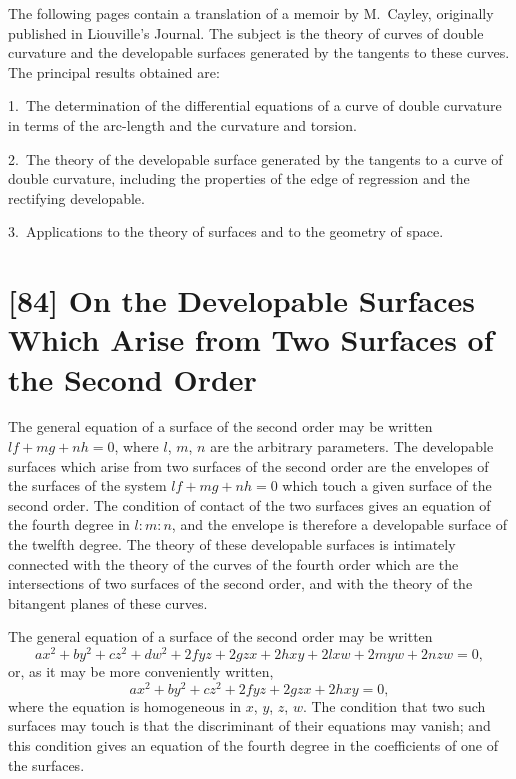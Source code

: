 \documentclass[11pt,a4paper]{book}
\begin{document}
\medskip

The following pages contain a translation of a memoir by M.~Cayley, originally published in Liouville's Journal. The subject is the theory of curves of double curvature and the developable surfaces generated by the tangents to these curves. The principal results obtained are:

1.~The determination of the differential equations of a curve of double curvature in terms of the arc-length and the curvature and torsion.

2.~The theory of the developable surface generated by the tangents to a curve of double curvature, including the properties of the edge of regression and the rectifying developable.

3.~Applications to the theory of surfaces and to the geometry of space.

\newpage
\section*{[84] On the Developable Surfaces Which Arise from Two Surfaces of the Second Order}

\bigskip

The general equation of a surface of the second order may be written $lf + mg + nh = 0$, where $l$, $m$, $n$ are the arbitrary parameters. The developable surfaces which arise from two surfaces of the second order are the envelopes of the surfaces of the system $lf + mg + nh = 0$ which touch a given surface of the second order. The condition of contact of the two surfaces gives an equation of the fourth degree in $l : m : n$, and the envelope is therefore a developable surface of the twelfth degree. The theory of these developable surfaces is intimately connected with the theory of the curves of the fourth order which are the intersections of two surfaces of the second order, and with the theory of the bitangent planes of these curves.

The general equation of a surface of the second order may be written
\[
ax^2 + by^2 + cz^2 + dw^2 + 2fyz + 2gzx + 2hxy + 2lxw + 2myw + 2nzw = 0,
\]
or, as it may be more conveniently written,
\[
ax^2 + by^2 + cz^2 + 2fyz + 2gzx + 2hxy = 0,
\]
where the equation is homogeneous in $x$, $y$, $z$, $w$. The condition that two such surfaces may touch is that the discriminant of their equations may vanish; and this condition gives an equation of the fourth degree in the coefficients of one of the surfaces.
\end{document}
